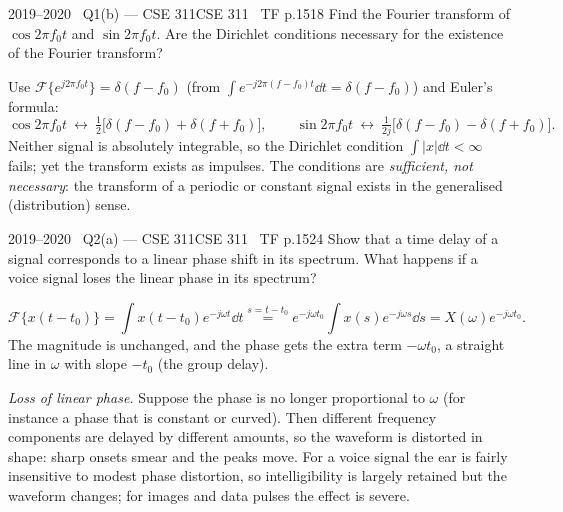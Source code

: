 \begin{qcard}{2019--2020 \textbullet\ Q1(b) --- CSE 311}{CSE 311 \textbullet\ TF p.15}{18}
Find the Fourier transform of $\cos2\pi f_0t$ and $\sin2\pi f_0t$. Are the Dirichlet conditions necessary for the existence of the Fourier transform?
\end{qcard}
\begin{solution}
Use $\mathcal F\{e^{j2\pi f_0t}\}=\delta(f-f_0)$ (from $\int e^{-j2\pi(f-f_0)t}\dd t=\delta(f-f_0)$) and Euler's formula:
\[\cos2\pi f_0t\ \leftrightarrow\ \tfrac12\big[\delta(f-f_0)+\delta(f+f_0)\big],\qquad \sin2\pi f_0t\ \leftrightarrow\ \tfrac1{2j}\big[\delta(f-f_0)-\delta(f+f_0)\big].\]
Neither signal is absolutely integrable, so the Dirichlet condition $\int|x|\dd t<\infty$ fails; yet the transform exists as impulses. The conditions are \emph{sufficient, not necessary}: the transform of a periodic or constant signal exists in the generalised (distribution) sense.
\end{solution}

\begin{qcard}{2019--2020 \textbullet\ Q2(a) --- CSE 311}{CSE 311 \textbullet\ TF p.15}{24}
Show that a time delay of a signal corresponds to a linear phase shift in its spectrum. What happens if a voice signal loses the linear phase in its spectrum?
\end{qcard}
\begin{solution}
\[\mathcal F\{x(t-t_0)\}=\int x(t-t_0)e^{-j\omega t}\dd t\overset{s=t-t_0}{=}e^{-j\omega t_0}\int x(s)e^{-j\omega s}\dd s=X(\omega)e^{-j\omega t_0}.\]
The magnitude is unchanged, and the phase gets the extra term $-\omega t_0$, a straight line in $\omega$ with slope $-t_0$ (the group delay).

\emph{Loss of linear phase.} Suppose the phase is no longer proportional to $\omega$ (for instance a phase that is constant or curved). Then different frequency components are delayed by different amounts, so the waveform is distorted in shape: sharp onsets smear and the peaks move. For a voice signal the ear is fairly insensitive to modest phase distortion, so intelligibility is largely retained but the waveform changes; for images and data pulses the effect is severe.
\end{solution}

